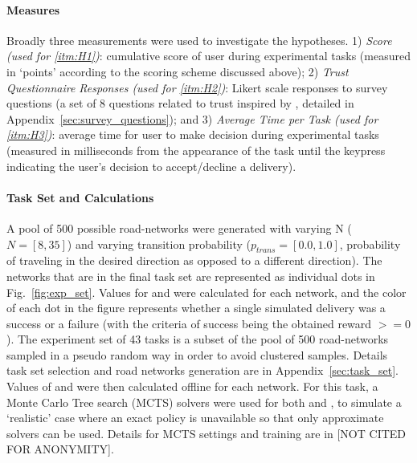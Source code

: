     \noindent \paragraph{Measures}
    Broadly three measurements were used to investigate the hypotheses. 1) \emph{Score (used for \ref{itm:H1})}: cumulative score of user during experimental tasks (measured in `points' according to the scoring scheme discussed above); 2) \emph{Trust Questionnaire Responses (used for \ref{itm:H2})}: Likert scale responses to survey questions (a set of 8 questions related to trust inspired by \cite{Muir1996-gt}, detailed in Appendix~\ref{sec:survey_questions}); and 3) \emph{Average Time per Task (used for \ref{itm:H3})}: average time for user to make decision during experimental tasks (measured in milliseconds from the appearance of the task until the keypress indicating the user's decision to accept/decline a delivery).

    \noindent \paragraph{Task Set and \famsec{} Calculations}
    A pool of 500 possible road-networks were generated with varying N ($N=[8,35]$) and varying transition probability ($p_{trans}=[0.0,1.0]$, probability of traveling in the desired direction as opposed to a different direction). The networks that are in the final task set are represented as individual dots in Fig.~\ref{fig:exp_set}. Values for \xQ{} and \xO{} were calculated for each network, and the color of each dot in the figure represents whether a single simulated delivery was a success or a failure (with the criteria of success being the obtained reward $ >= 0$). The experiment set of 43 tasks is a subset of the pool of 500 road-networks sampled in a pseudo random way in order to avoid clustered samples. Details task set selection and road networks generation are in Appendix~\ref{sec:task_set}. Values of \xQ{} and \xO{} were then calculated offline for each network. 
    For this task, a Monte Carlo Tree search (MCTS) solvers were used for both \solvetrust{} and \solvecand{}, to simulate a `realistic' case where an exact policy is unavailable so that only approximate solvers can be used. 
    Details for MCTS settings and training \surrogate{} are in [NOT CITED FOR ANONYMITY]. 

